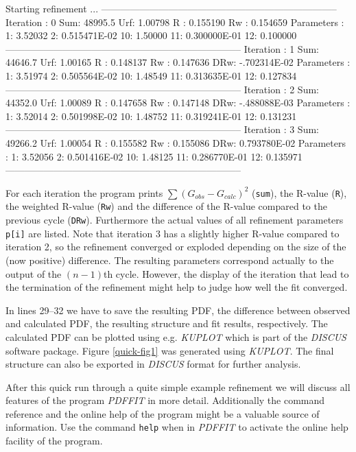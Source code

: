 \footnotesize
\begin{MacVerbatim}
     Starting refinement ...
     --------------------------------------------------------------------------
     Iteration  :   0  Sum:  48995.5     Urf:  1.00798
                       R  : 0.155190     Rw : 0.154659
     Parameters :
       1:  3.52032       2: 0.515471E-02  10:  1.50000      11: 0.300000E-01
      12: 0.100000
     --------------------------------------------------------------------------
     Iteration  :   1  Sum:  44646.7     Urf:  1.00165
                       R  : 0.148137     Rw : 0.147636     DRw: -.702314E-02
     Parameters :
       1:  3.51974       2: 0.505564E-02  10:  1.48549      11: 0.313635E-01
      12: 0.127834
     --------------------------------------------------------------------------
     Iteration  :   2  Sum:  44352.0     Urf:  1.00089
                       R  : 0.147658     Rw : 0.147148     DRw: -.488088E-03
     Parameters :
       1:  3.52014       2: 0.501998E-02  10:  1.48752      11: 0.319241E-01
      12: 0.131231
     --------------------------------------------------------------------------
     Iteration  :   3  Sum:  49266.2     Urf:  1.00054
                       R  : 0.155582     Rw : 0.155086     DRw: 0.793780E-02
     Parameters :
       1:  3.52056       2: 0.501416E-02  10:  1.48125      11: 0.286770E-01
      12: 0.135971
     --------------------------------------------------------------------------
\end{MacVerbatim}
\normalsize

\noindent For each iteration the program prints $\sum
(G_{obs}-G_{calc})^{2}$ ({\tt sum}), the R-value ({\tt R}), the
weighted R-value ({\tt Rw}) and the difference of the R-value
compared to the previous cycle ({\tt DRw}). Furthermore the actual
values of all refinement parameters {\tt p[i]} are listed. Note
that iteration 3 has a slightly higher R-value compared to
iteration 2, so the refinement converged or exploded depending on
the size of the (now positive) difference. The resulting
parameters correspond actually to the output of the $(n-1)$th
cycle. However, the display of the iteration that lead to the
termination of the refinement might help to judge how well the fit
converged. \par

In lines 29--32 we have to save the resulting PDF, the difference between
observed and calculated PDF, the resulting structure and
fit results, respectively. The calculated PDF can be plotted using
e.g. {\it KUPLOT} which is part of the {\it DISCUS} software package.
Figure \ref{quick-fig1} was generated using {\it KUPLOT}. The final
structure can also be exported in {\it DISCUS} format for further
analysis. \par

After this quick run through a quite simple example refinement we will
discuss all features of the program {\it PDFFIT} in more detail.
Additionally the command reference and the online help of the program
might be a valuable source of information. Use the command {\tt help}
when in {\it PDFFIT} to activate the online help facility of the
program.

